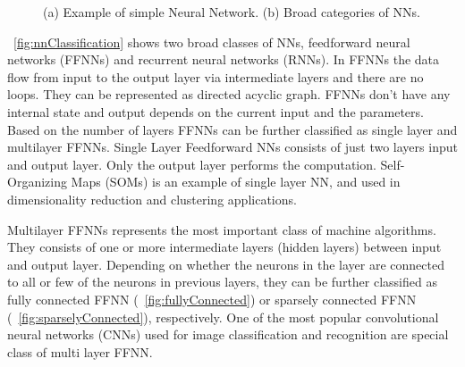 \documentclass[a4paper,10pt]{article}
\begin{document}
\begin{figure}[!htb]
	\centering
	\hfil
	\hfil
	\caption{(a) Example of simple Neural Network. (b) Broad categories of NNs.}
	\label{fig:intro}
	\vspace{-1.0em}	
\end{figure}

\figurename{~\ref{fig:nnClassification}} shows two broad classes of NNs, feedforward neural networks (FFNNs) and recurrent neural networks (RNNs). In FFNNs the data flow from input to the output layer via intermediate layers and there are no loops. They can be represented as directed acyclic graph. FFNNs don't have any internal state and output depends on the current input and the parameters. Based on the number of layers FFNNs can be further classified as single layer and multilayer FFNNs. Single Layer Feedforward NNs consists of just two layers input and output layer. Only the output layer performs the computation. Self-Organizing Maps (SOMs) is an example of single layer NN, and used in dimensionality reduction and clustering applications. 

Multilayer FFNNs represents the most important class of machine algorithms. They consists of one or more intermediate layers (hidden layers) between input and output layer. Depending on whether the neurons in the layer are connected to all or few of the neurons in previous layers, they can be further classified as fully connected FFNN (\figurename{~\ref{fig:fullyConnected}}) or sparsely connected FFNN (\figurename{~\ref{fig:sparselyConnected}}), respectively. One of the most popular convolutional neural networks (CNNs) used for image classification and recognition are special class of multi layer FFNN.
\end{document}
